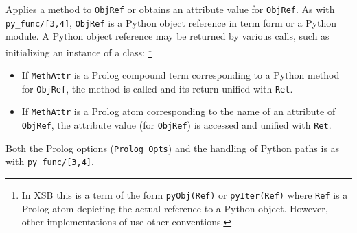 \begin{description}
%
Applies a method to {\tt ObjRef} or obtains an attribute value for
\texttt{ObjRef}.  As with {\tt py\_func/[3,4]}, {\tt ObjRef} is a
Python object reference in term form or a Python module.  A Python
object reference may be returned by various calls, such as
initializing an instance of a class: \footnote{In XSB this is a term
of the form {\tt pyObj(Ref)} or {\tt pyIter(Ref)} where {\tt Ref} is a
Prolog atom depicting the actual reference to a Python object.
However, other implementations of \janus{} use other conventions.}
\begin{itemize}
\item If {\tt MethAttr} is a Prolog compound term corresponding to a
  Python method for {\tt ObjRef}, the method is called and its return
  unified with {\tt Ret}.

%
\item If {\tt MethAttr} is a Prolog atom corresponding to the name of
  an attribute of {\tt ObjRef}, the attribute value (for \texttt{ObjRef})
  is accessed and unified
  with {\tt Ret}.
\end{itemize}

Both the Prolog options ({\tt Prolog\_Opts}) and the handling of Python
paths is as with {\tt py\_func/[3,4]}.


\end{description}
